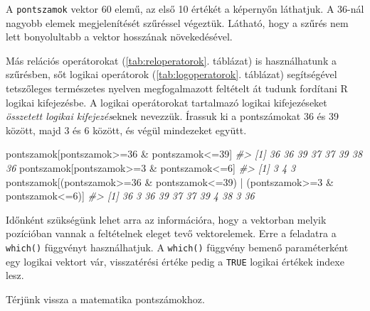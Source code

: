 \documentclass[
]{book}
\newenvironment{Shaded}{\begin{snugshade}}{\end{snugshade}}
\newcommand{\CommentTok}[1]{\textcolor[rgb]{0.56,0.35,0.01}{\textit{#1}}}
\newcommand{\DecValTok}[1]{\textcolor[rgb]{0.00,0.00,0.81}{#1}}
\newcommand{\NormalTok}[1]{#1}
\newcommand{\SpecialCharTok}[1]{\textcolor[rgb]{0.00,0.00,0.00}{#1}}
\begin{document}
A \texttt{pontszamok} vektor 60 elemű, az első 10 értékét a képernyőn láthatjuk. A 36-nál nagyobb elemek megjelenítését szűréssel végeztük. Látható, hogy a szűrés nem lett bonyolultabb a vektor hosszának növekedésével.

Más relációs operátorokat (\ref{tab:reloperatorok}. táblázat) is használhatunk a szűrésben, sőt logikai operátorok (\ref{tab:logoperatorok}. táblázat) segítségével tetszőleges természetes nyelven megfogalmazott feltételt át tudunk fordítani R logikai kifejezésbe. A logikai operátorokat tartalmazó logikai kifejezéseket \emph{összetett logikai kifejezés}eknek nevezzük. Írassuk ki a pontszámokat 36 és 39 között, majd 3 és 6 között, és végül mindezeket együtt.

\begin{Shaded}
\begin{Highlighting}[]
\NormalTok{pontszamok[pontszamok}\SpecialCharTok{\textgreater{}=}\DecValTok{36} \SpecialCharTok{\&}\NormalTok{ pontszamok}\SpecialCharTok{\textless{}=}\DecValTok{39}\NormalTok{]}
\CommentTok{\#\textgreater{} [1] 36 36 39 37 37 39 38 36}
\NormalTok{pontszamok[pontszamok}\SpecialCharTok{\textgreater{}=}\DecValTok{3} \SpecialCharTok{\&}\NormalTok{ pontszamok}\SpecialCharTok{\textless{}=}\DecValTok{6}\NormalTok{]}
\CommentTok{\#\textgreater{} [1] 3 4 3}
\NormalTok{pontszamok[(pontszamok}\SpecialCharTok{\textgreater{}=}\DecValTok{36} \SpecialCharTok{\&}\NormalTok{ pontszamok}\SpecialCharTok{\textless{}=}\DecValTok{39}\NormalTok{) }\SpecialCharTok{|}\NormalTok{ (pontszamok}\SpecialCharTok{\textgreater{}=}\DecValTok{3} \SpecialCharTok{\&}\NormalTok{ pontszamok}\SpecialCharTok{\textless{}=}\DecValTok{6}\NormalTok{)]}
\CommentTok{\#\textgreater{}  [1] 36  3 36 39 37 37 39  4 38  3 36}
\end{Highlighting}
\end{Shaded}

Időnként szükségünk lehet arra az információra, hogy a vektorban melyik pozícióban vannak a feltételnek eleget tevő vektorelemek. Erre a feladatra a \texttt{which()} függvényt használhatjuk. A \texttt{which()} függvény bemenő paraméterként egy logikai vektort vár, visszatérési értéke pedig a \texttt{TRUE} logikai értékek indexe lesz.

Térjünk vissza a matematika pontszámokhoz.
\end{document}

